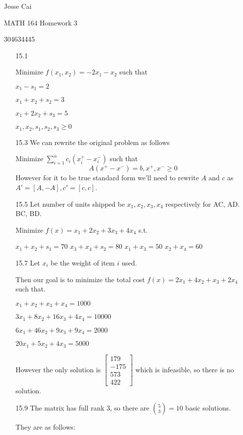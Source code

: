 \documentclass[10pt,a4paper]{article}
\newcommand\m[1]{\begin{bmatrix}#1\end{bmatrix}}
\begin{document}
Jesse Cai

MATH 164 Homework 3

304634445

\begin{enumerate}
    \item[15.1] 

     Minimize $f(x_1, x_2) = -2x_1 -x_2$ such that 

    $x_1 -s_1 = 2 $

    $x_1 + x_2 +s_2 = 3$

    $x_1 + 2x_2 + s_3 = 5$

    $x_1, x_2, s_1, s_2, s_3 \geq 0$

    \item [15.3] We can rewrite the original problem as follows
    
    Minimize $\sum_{i=1}^n c_i(x_i^+ - x_i^-)$ such that
    $$A(x^+ - x^-) = b, x^+, x^- \geq 0$$
    However for it to be true standard form we'll need to rewrite $A$ and $c$ as $A' = [A, -A], c'= [c, c]$.

    \item [15.5]
        Let number of units shipped be $x_1, x_2, x_3, x_4$ respectively for AC, AD. BC, BD.

        Minimize $f(x) = x_1 + 2x_2 + 3x_3 + 4x_4 $ s.t.

        $x_1 + x_2 + s_1 = 70$
        $x_3 + x_4 + s_2 = 80$
        $x_1 + x_3 = 50$
        $x_2 + x_4 = 60$
    
    \item [15.7] Let $x_i$ be the weight of item $i$ used.

    Then our goal is to minimize the total cost $f(x) = 2x_1 + 4x_2 + x_3 + 2x_4$ such that. 

        $x_1 + x_2 + x_3 + x_4 = 1000$

        $3x_1 + 8x_2 + 16x_3 + 4x_4 = 10000$

        $6x_1 + 46x_2 + 9x_3 + 9x_4 = 2000$

        $20x_1 + 5x_2 + 4x_3  = 5000$

    However the only solution is $\m{179 \\ -175 \\ 573 \\ 422}$ which is infeasible, so there is no solution.
    
    \item [15.9] The matrix has full rank $3$, so there are ${5 \choose 3}  = 10$ basic solutions.
    
        They are as follows:


\end{enumerate}
\end{document}
